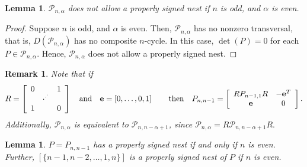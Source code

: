 \documentclass[10pt]{amsart}
\newtheorem{lemma}[proposition]{Lemma}
\newtheorem{remark}[proposition]{Remark}
\begin{document}
\begin{lemma}\label{badPos}
${\mathcal{P}}_{n, \alpha}$ does not allow a properly signed nest if $n$ is odd, and $\alpha$ is even.
\end{lemma}

\begin{proof}
Suppose $n$ is odd, and $\alpha$ is even. Then, ${\mathcal{P}}_{n, \alpha}$ has no nonzero transversal, that is, 
$D({\mathcal{P}}_{n, \alpha})$ has no composite $n$-cycle. In this case, $\det(P) = 0$
for each $P\in {\mathcal{P}}_{n, \alpha}$. Hence, ${\mathcal{P}}_{n, \alpha}$ does not allow a properly signed nest.
\end{proof}

\begin{remark}\label{R}{\rm
Note that if 
\begin{equation*}
R = \left[ \begin{array}{ccc}
0 	&       & 1	\\
    &{\cdot^{\cdot^{\cdot}}}& \\
1 	&       & 0 \end{array} \right] {\rm{\quad and \quad}}
\mathbf{e} = \left[0,\ldots,0, 1\right]
{\rm{ \qquad then \quad}}
P_{n, n-1} = \left[ \begin{array}{cc}
RP_{n-1, 1}R 		& -\mathbf{e}^T	\\
\mathbf{e} 		& 0 \end{array} \right]. 
\end{equation*}
 Additionally, ${\mathcal{P}}_{n, \alpha}$ is equivalent to ${\mathcal{P}}_{n, n-\alpha +1}$, since ${\mathcal{P}}_{n, \alpha} = R{\mathcal{P}}_{n, n-\alpha +1}R.$
}\end{remark}

\begin{lemma}\label{pathLemma2}
$P=P_{n, n-1}$ has a properly signed nest if and only if $n$ is even. Further, $[\{n-1,n-2,\ldots,1,n\}]$
is a properly signed nest of $P$ if $n$ is even.
\end{lemma}
\end{document}
